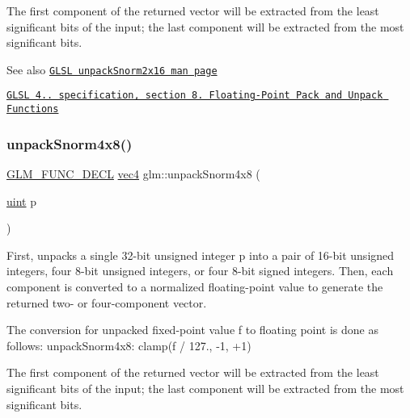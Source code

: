 The first component of the returned vector will be extracted from the least significant bits of the input; the last component will be extracted from the most significant bits.

\begin{DoxySeeAlso}{See also}
\href{http://www.opengl.org/sdk/docs/manglsl/xhtml/unpackSnorm2x16.xml}{\tt G\+L\+SL unpack\+Snorm2x16 man page} 

\href{http://www.opengl.org/registry/doc/GLSLangSpec.4.20.8.pdf}{\tt G\+L\+SL 4.. specification, section 8. Floating-\/\+Point Pack and Unpack Functions} 
\end{DoxySeeAlso}
\mbox{\label{group__core__func__packing_ga2db488646d48b7c43d3218954523fe82}} 
\subsubsection{\texorpdfstring{unpack\+Snorm4x8()}{unpackSnorm4x8()}}
{\footnotesize\ttfamily \hyperlink{setup_8hpp_ab2d052de21a70539923e9bcbf6e83a51}{G\+L\+M\+\_\+\+F\+U\+N\+C\+\_\+\+D\+E\+CL} \hyperlink{group__core__types_ga5881b1b022d7fd1b7218f5916532dd02}{vec4} glm\+::unpack\+Snorm4x8 (\begin{DoxyParamCaption}\item[{\hyperlink{group__core__precision_ga4fd29415871152bfb5abd588334147c8}{uint}}]{p }\end{DoxyParamCaption})}

First, unpacks a single 32-\/bit unsigned integer p into a pair of 16-\/bit unsigned integers, four 8-\/bit unsigned integers, or four 8-\/bit signed integers. Then, each component is converted to a normalized floating-\/point value to generate the returned two-\/ or four-\/component vector.

The conversion for unpacked fixed-\/point value f to floating point is done as follows\+: unpack\+Snorm4x8\+: clamp(f / 127., -\/1, +1)

The first component of the returned vector will be extracted from the least significant bits of the input; the last component will be extracted from the most significant bits.

